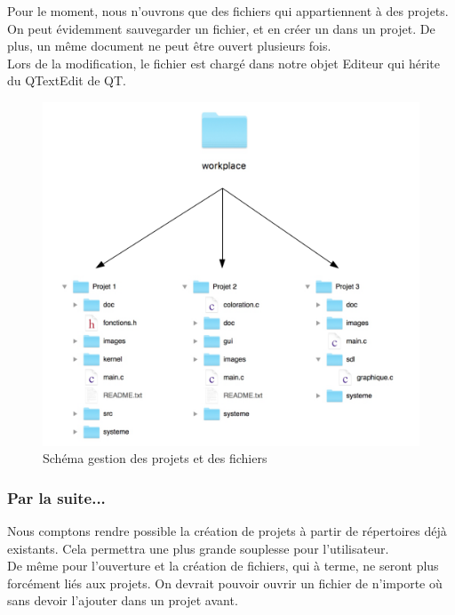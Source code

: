 \documentclass[a4paper,12pt]{article}
\begin{document}
		Pour le moment, nous n'ouvrons que des fichiers qui appartiennent à des projets. On peut évidemment sauvegarder un fichier, et en créer un dans un projet. De plus, un même document ne peut être ouvert plusieurs fois.\\
		Lors de la modification, le fichier est chargé dans notre objet Editeur qui hérite du QTextEdit de QT.
		
		\begin{figure}[h!]
			\begin{center}
				\includegraphics[scale=0.5]{images/nav_fic}
				\caption{Schéma gestion des projets et des fichiers}
			\end{center}
		\end{figure}
		
		\newpage
			
		\subsubsection*{Par la suite...}
		
				Nous comptons rendre possible la création de projets à partir de répertoires déjà existants. Cela permettra une plus grande souplesse pour l'utilisateur.\\
				De même pour l'ouverture et la création de fichiers, qui à terme, ne seront plus forcément liés aux projets. On devrait pouvoir ouvrir un fichier de n'importe où sans devoir l'ajouter dans un projet avant.\\
				
\end{document}
